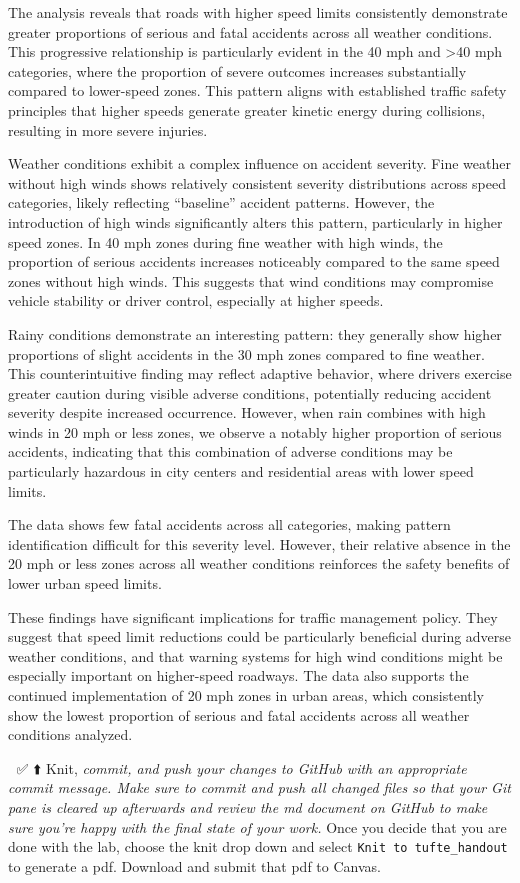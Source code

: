 \documentclass[
]{article}
\begin{document}
The analysis reveals that roads with higher speed limits consistently
demonstrate greater proportions of serious and fatal accidents across
all weather conditions. This progressive relationship is particularly
evident in the 40 mph and \textgreater40 mph categories, where the
proportion of severe outcomes increases substantially compared to
lower-speed zones. This pattern aligns with established traffic safety
principles that higher speeds generate greater kinetic energy during
collisions, resulting in more severe injuries.

Weather conditions exhibit a complex influence on accident severity.
Fine weather without high winds shows relatively consistent severity
distributions across speed categories, likely reflecting ``baseline''
accident patterns. However, the introduction of high winds significantly
alters this pattern, particularly in higher speed zones. In 40 mph zones
during fine weather with high winds, the proportion of serious accidents
increases noticeably compared to the same speed zones without high
winds. This suggests that wind conditions may compromise vehicle
stability or driver control, especially at higher speeds.

Rainy conditions demonstrate an interesting pattern: they generally show
higher proportions of slight accidents in the 30 mph zones compared to
fine weather. This counterintuitive finding may reflect adaptive
behavior, where drivers exercise greater caution during visible adverse
conditions, potentially reducing accident severity despite increased
occurrence. However, when rain combines with high winds in 20 mph or
less zones, we observe a notably higher proportion of serious accidents,
indicating that this combination of adverse conditions may be
particularly hazardous in city centers and residential areas with lower
speed limits.

The data shows few fatal accidents across all categories, making pattern
identification difficult for this severity level. However, their
relative absence in the 20 mph or less zones across all weather
conditions reinforces the safety benefits of lower urban speed limits.

These findings have significant implications for traffic management
policy. They suggest that speed limit reductions could be particularly
beneficial during adverse weather conditions, and that warning systems
for high wind conditions might be especially important on higher-speed
roadways. The data also supports the continued implementation of 20 mph
zones in urban areas, which consistently show the lowest proportion of
serious and fatal accidents across all weather conditions analyzed.

🧶 ✅ ⬆️ Knit, \emph{commit, and push your changes to GitHub with an
appropriate commit message. Make sure to commit and push all changed
files so that your Git pane is cleared up afterwards and review the md
document on GitHub to make sure you're happy with the final state of
your work.} Once you decide that you are done with the lab, choose the
knit drop down and select \texttt{Knit\ to\ tufte\_handout} to generate
a pdf. Download and submit that pdf to Canvas.
\end{document}
